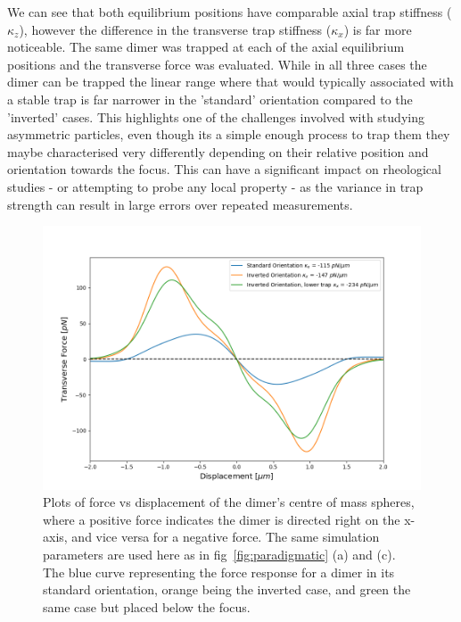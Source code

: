 We can see that both equilibrium positions have 
comparable axial trap stiffness ($\kappa_z$), 
however the difference in the transverse trap 
stiffness ($\kappa_x$) is far more noticeable. 
The same dimer was trapped at each of the axial 
equilibrium positions and the transverse force was 
evaluated. While in all three cases the dimer can be 
trapped the linear range where that would typically 
associated with a stable trap is far narrower in the 
'standard' orientation compared to the 'inverted' cases. 
This highlights one of the challenges involved with 
studying asymmetric particles, even though its a 
simple enough process to trap them they maybe 
characterised very differently depending on their 
relative position and orientation towards the focus. 
This can have a significant impact on rheological 
studies - or attempting to probe any local property 
- as the variance in trap strength can result in 
large errors over repeated measurements. 
\begin{figure}[h!]
	\centering
	\includegraphics[width=\linewidth]{transverse_force.png}
	\caption{Plots of force vs displacement of the dimer's 
		centre of mass spheres, where a positive force 
		indicates the dimer is directed right on the x-axis, 
		and vice versa for a negative force. The same simulation 
		parameters are used here as in fig~\ref{fig:paradigmatic}
		(a) and (c). The blue curve representing the force 
		response for a dimer in its standard orientation, orange 
		being the inverted case, and green the same case but 
		placed below the focus.}
	\label{fig:transverse_force}
\end{figure}

